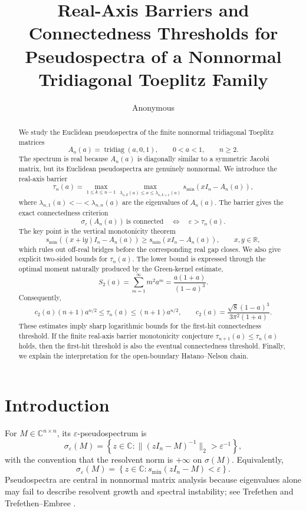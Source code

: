 \documentclass[11pt]{amsart}
\title[Connectedness thresholds for Toeplitz pseudospectra]
{Real-Axis Barriers and Connectedness Thresholds for Pseudospectra of a Nonnormal Tridiagonal Toeplitz Family}
\author{Anonymous}
\numberwithin{equation}{section}
\DeclareMathOperator{\tridiag}{tridiag}
\newcommand{\C}{\mathbb C}
\newcommand{\R}{\mathbb R}
\newcommand{\eps}{\varepsilon}
\newcommand{\ii}{\mathrm i}
\begin{document}
\begin{abstract}
We study the Euclidean pseudospectra of the finite nonnormal tridiagonal Toeplitz matrices
\[
A_n(a)=\tridiag(a,0,1),\qquad 0<a<1,\qquad n\ge2.
\]
The spectrum is real because \(A_n(a)\) is diagonally similar to a symmetric Jacobi matrix, but its Euclidean pseudospectra are genuinely nonnormal.  We introduce the real-axis barrier
\[
\tau_n(a)
=
\max_{1\le k\le n-1}
\max_{\lambda_{n,k}(a)\le x\le \lambda_{n,k+1}(a)}
s_{\min}(xI_n-A_n(a)),
\]
where \(\lambda_{n,1}(a)<\cdots<\lambda_{n,n}(a)\) are the eigenvalues of \(A_n(a)\).  The barrier gives the exact connectedness criterion
\[
\sigma_\eps(A_n(a))\ \text{is connected}
\quad\Longleftrightarrow\quad
\eps>\tau_n(a).
\]
The key point is the vertical monotonicity theorem
\[
s_{\min}((x+\ii y)I_n-A_n(a))
\ge
s_{\min}(xI_n-A_n(a)),
\qquad x,y\in\R,
\]
which rules out off-real bridges before the corresponding real gap closes.  We also give explicit two-sided bounds for \(\tau_n(a)\).  The lower bound is expressed through the optimal moment naturally produced by the Green-kernel estimate,
\[
S_2(a)=\sum_{m=1}^{\infty}m^2a^m=\frac{a(1+a)}{(1-a)^3}.
\]
Consequently,
\[
c_2(a)(n+1)a^{n/2}
\le
\tau_n(a)
\le
(n+1)a^{n/2},
\qquad
c_2(a)=\frac{\sqrt8(1-a)^3}{3\pi^2(1+a)}.
\]
These estimates imply sharp logarithmic bounds for the first-hit connectedness threshold.  If the finite real-axis barrier monotonicity conjecture \(\tau_{n+1}(a)\le\tau_n(a)\) holds, then the first-hit threshold is also the eventual connectedness threshold.  Finally, we explain the interpretation for the open-boundary Hatano--Nelson chain.
\end{abstract}

\maketitle

\section{Introduction}

For \(M\in\C^{n\times n}\), its \(\eps\)-pseudospectrum is
\[
\sigma_\eps(M)
=
\left\{
z\in\C:\|(zI_n-M)^{-1}\|_2>\eps^{-1}
\right\},
\]
with the convention that the resolvent norm is \(+\infty\) on \(\sigma(M)\).  Equivalently,
\[
\sigma_\eps(M)
=
\left\{
z\in\C:s_{\min}(zI_n-M)<\eps
\right\}.
\]
Pseudospectra are central in nonnormal matrix analysis because eigenvalues alone may fail to describe resolvent growth and spectral instability; see Trefethen \cite{Trefethen1997} and Trefethen--Embree \cite{TrefethenEmbree2005}.
\end{document}
